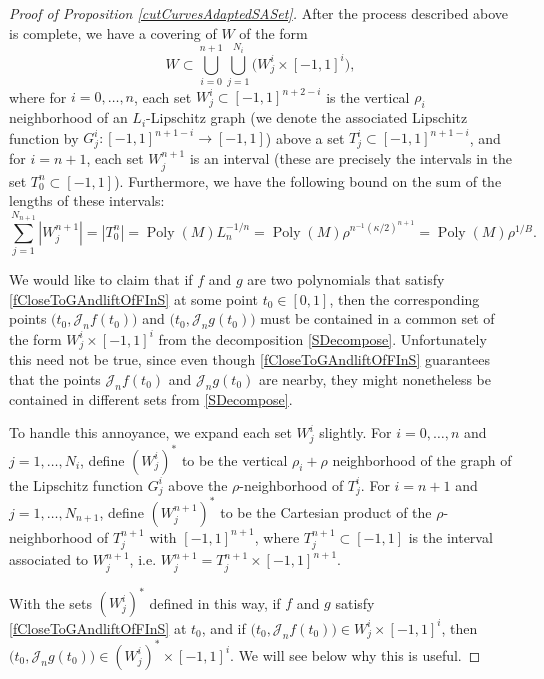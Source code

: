 \documentclass[letterpaper, reqno,11pt]{article}
\numberwithin{equation}{section}
\newcommand{\poly}{\operatorname{Poly}}
\numberwithin{thm}{section}
\theoremstyle{remark}
\begin{document}
\begin{proof}[Proof of Proposition \ref{cutCurvesAdaptedSASet}]
After the process described above is complete, we have a covering of $W$ of the form
\begin{equation}\label{SDecompose}
W \subset \bigcup_{i=0}^{n+1} \bigcup_{j=1}^{N_i} \big( W^i_j \times [-1,1]^{i}\big),
\end{equation}
where for $i=0,\ldots,n$, each set $W^i_j\subset [-1,1]^{n+2-i}$ is the vertical $\rho_i$ neighborhood of an $L_i$-Lipschitz graph (we denote the associated Lipschitz function by $G^i_j\colon[-1,1]^{n+1-i}\to[-1,1]$) above a set $T^i_j\subset[-1,1]^{n+1-i}$, and for $i=n+1$,  each set $W_j^{n+1}$ is an interval (these are precisely the intervals in the set $T_0^n\subset[-1,1]$). Furthermore, we have the following bound on the sum of the lengths of these intervals:
\begin{equation}
\sum_{j=1}^{N_{n+1}}|W^{n+1}_j| = |T_0^n| =\poly(M)L_n^{-1/n} = \poly(M)\rho^{n^{-1}(\kappa/2)^{n+1}}=\poly(M)\rho^{1/B}.
\end{equation}

We would like to claim that if $f$ and $g$ are two polynomials that satisfy \eqref{fCloseToGAndliftOfFInS} at some point $t_0\in[0,1]$, then the corresponding points $\big(t_0, \mathcal{J}_n f(t_0)\big)$ and $\big(t_0, \mathcal{J}_n g(t_0)\big)$ must be contained in a common set of the form $W^i_j \times [-1,1]^{i}$ from the decomposition \eqref{SDecompose}. Unfortunately this need not be true, since even though \eqref{fCloseToGAndliftOfFInS} guarantees that the points $\mathcal{J}_n f(t_0)$ and $\mathcal{J}_n g(t_0)$ are nearby, they might nonetheless be contained in different sets from \eqref{SDecompose}.

To handle this annoyance, we expand each set $W^i_j$ slightly. For $i=0,\ldots,n$ and $j=1,\ldots,N_i$, define $(W^i_j)^*$ to be the vertical $\rho_i+\rho$ neighborhood of the graph of the Lipschitz function $G^i_j$ above the $\rho$-neighborhood of $T^i_j$. For $i=n+1$ and $j=1,\ldots,N_{n+1}$, define $(W^{n+1}_j)^*$ to be the Cartesian product of the $\rho$-neighborhood of $T^{n+1}_j$ with $[-1,1]^{n+1}$, where $T^{n+1}_j\subset[-1,1]$ is the interval associated to $W^{n+1}_j$, i.e. $W^{n+1}_j = T^{n+1}_j\times[-1,1]^{n+1}$.

With the sets $(W^i_j)^*$ defined in this way, if $f$ and $g$ satisfy \eqref{fCloseToGAndliftOfFInS} at $t_0$, and if $\big(t_0, \mathcal{J}_n f(t_0)\big)\in W^i_j \times [-1,1]^{i}$, then $\big(t_0, \mathcal{J}_n g(t_0)\big)\in (W^i_j)^* \times [-1,1]^{i}$. We will see below why this is useful. 



\end{proof}
\end{document}
